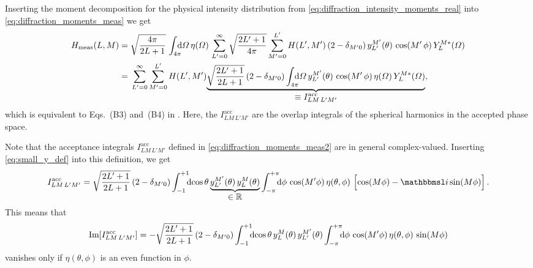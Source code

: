 Inserting the moment decomposition for the physical intensity distribution
from \cref{eq:diffraction_intensity_moments_real} into
\cref{eq:diffraction_moments_meas} we get
\begin{align}
  H_\text{meas}(L, M)
  ={}& \sqrt{\frac{4 \pi}{2 L + 1}}\, \int_{4 \pi}\!\!\!\! \dif{\Omega}\, \eta(\Omega)\,
  \sum_{L' = 0}^\infty \sqrt{\frac{2 L' + 1}{4 \pi}} \sum_{M' = 0}^{L'} H(L', M')\, (2 - \delta_{M' 0})\, y_{L'}^{M'}(\theta)\, \cos(M'\, \phi)\,
  Y_L^{M *}(\Omega) \nonumber
  \\
  \label{eq:diffraction_moments_meas2}
  ={}& \sum_{L' = 0}^\infty \sum_{M' = 0}^{L'} H(L', M')
  \dUnderbrace{\sqrt{\frac{2 L' + 1}{2 L + 1}}\, (2 - \delta_{M' 0}) \int_{4 \pi}\!\!\!\! \dif{\Omega}\,
  y_{L'}^{M'}(\theta)\, \cos(M'\, \phi)\, \eta(\Omega)\, Y_L^{M *}(\Omega)}{\equiv I^\text{acc}_{L M\, L' M'}},
\end{align}
which is equivalent to Eqs.~(B3) and~(B4) in .
Here, the $I^\text{acc}_{L M\, L' M'}$ are the overlap integrals of
the spherical harmonics in the accepted phase space.

Note that the acceptance integrals $I^\text{acc}_{L M\, L' M'}$
defined in \cref{eq:diffraction_moments_meas2} are in general
complex-valued.  Inserting \cref{eq:small_y_def} into this definition,
we get
\begin{equation}
  \label{eq:diffraction_integral_matrix_detail}
  I^\text{acc}_{L M\, L' M'}
  = \sqrt{\dfrac{2 L' + 1}{2 L + 1}}\, (2 - \delta_{M' 0})
  \int_{-1}^{+1}\!\!\! \dif{\cos \theta}\, \dUnderbrace{y_{L'}^{M'}(\theta)\, y_L^M(\theta)}{\in \mathbb{R}}
  \int_{-\pi}^{+\pi}\!\!\! \dif{\phi}\,
  \cos(M' \phi)\, \eta(\theta, \phi)\, \sBrk[2]{\cos(M \phi) - \imag \sin(M \phi)}.
\end{equation}
This means that
\begin{equation}
  \Im{I^\text{acc}_{L M\, L' M'}}
  = -\sqrt{\dfrac{2 L' + 1}{2 L + 1}}\, (2 - \delta_{M' 0})
  \int_{-1}^{+1}\!\!\! \dif{\cos \theta}\, y_L^M(\theta)\, y_{L'}^{M'}(\theta)
  \int_{-\pi}^{+\pi}\!\!\! \dif{\phi}\,
  \cos(M' \phi)\, \eta(\theta, \phi)\, \sin(M \phi)
\end{equation}
vanishes only if $\eta(\theta, \phi)$ is an even function in $\phi$.

